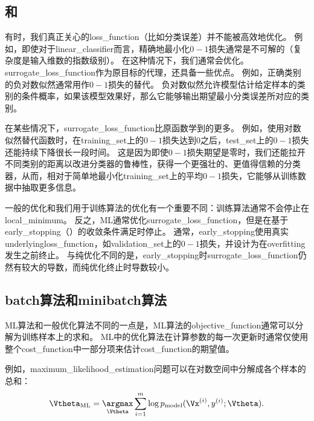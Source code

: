 \subsection{和}
\label{sec:surrogate_loss_functions_and_early_stopping}
有时，我们真正关心的\gls{loss_function}（比如分类误差）并不能被高效地优化。
例如，即使对于\gls{linear_classifier}而言，精确地最小化$0-1$损失通常是不可解的（复杂度是输入维数的指数级别）\citep{Marcotte-Savard-1992}。
在这种情况下，我们通常会优化。
\gls{surrogate_loss_function}作为原目标的代理，还具备一些优点。  
例如，正确类别的负对数似然通常用作$0-1$损失的替代。
负对数似然允许模型估计给定样本的类别的条件概率，如果该模型效果好，那么它能够输出期望最小分类误差所对应的类别。


在某些情况下，\gls{surrogate_loss_function}比原函数学到的更多。
例如，使用对数似然替代函数时，在\gls{training_set}上的$0-1$损失达到$0$之后，\gls{test_set}上的$0-1$损失还能持续下降很长一段时间。
这是因为即使$0-1$损失期望是零时，我们还能拉开不同类别的距离以改进分类器的鲁棒性，获得一个更强壮的、更值得信赖的分类器，从而，相对于简单地最小化\gls{training_set}上的平均$0-1$损失，它能够从训练数据中抽取更多信息。


一般的优化和我们用于训练算法的优化有一个重要不同：训练算法通常不会停止在\gls{local_minimum}。
反之，\gls{ML}通常优化\gls{surrogate_loss_function}，但是在基于\gls{early_stopping}（）的收敛条件满足时停止。
通常，\gls{early_stopping}使用真实\gls{underlying}\gls{loss_function}，如\gls{validation_set}上的$0-1$损失，并设计为在\gls{overfitting}发生之前终止。
与纯优化不同的是，\gls{early_stopping}时\gls{surrogate_loss_function}仍然有较大的导数，而纯优化终止时导数较小。


\subsection{\gls{batch}算法和\gls{minibatch}算法}
\label{sec:batch_and_minibatch_algorithms}
\gls{ML}算法和一般优化算法不同的一点是，\gls{ML}算法的\gls{objective_function}通常可以分解为训练样本上的求和。
\gls{ML}中的优化算法在计算参数的每一次更新时通常仅使用整个\gls{cost_function}中一部分项来估计\gls{cost_function}的期望值。

例如，\gls{maximum_likelihood_estimation}问题可以在对数空间中分解成各个样本的总和：
\begin{equation}
\label{eq:8.4}
    \Vtheta_{\text{ML}} = \underset{\Vtheta}{\argmax} \sum_{i=1}^m
    \log p_{\text{model}} (\Vx^{(i)}, y^{(i)}; \Vtheta) .
\end{equation}


